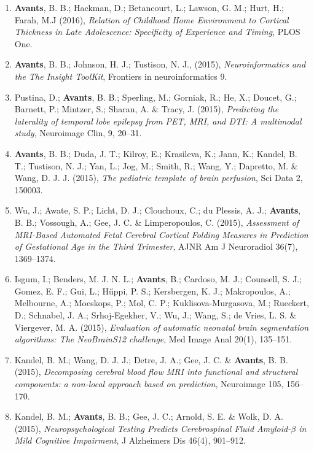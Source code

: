 \documentclass[11pt]{moderncv} %
\begin{document}
\begin{enumerate}
\item \textbf{Avants}, B. B.; Hackman, D.; Betancourt, L.; Lawson, G. M.; Hurt, H.; Farah, M.J (2016), \textit{Relation of Childhood Home Environment to Cortical Thickness in Late Adolescence: Specificity of Experience and Timing}, PLOS One.

\item  \textbf{Avants}, B. B.; Johnson, H. J.; Tustison, N. J., (2015), \textit{Neuroinformatics and the The Insight ToolKit}, Frontiers in neuroinformatics 9.

\item Pustina, D.; \textbf{Avants}, B. B.; Sperling, M.; Gorniak, R.; He, X.; Doucet, G.; Barnett, P.; Mintzer, S.; Sharan, A. \& Tracy, J. (2015), \textit{Predicting the laterality of temporal lobe epilepsy from PET, MRI, and DTI: A multimodal study}, Neuroimage Clin, 9, 20--31.

\item \textbf{Avants}, B. B.; Duda, J. T.; Kilroy, E.; Krasileva, K.; Jann, K.; Kandel, B. T.; Tustison, N. J.; Yan, L.; Jog, M.; Smith, R.; Wang, Y.; Dapretto, M. \& Wang, D. J. J. (2015), \textit{The pediatric template of brain perfusion}, Sci Data 2, 150003.

\item Wu, J.; Awate, S. P.; Licht, D. J.; Clouchoux, C.; du Plessis, A. J.; \textbf{Avants}, B. B.; Vossough, A.; Gee, J. C. \& Limperopoulos, C. (2015), \textit{Assessment of MRI-Based Automated Fetal Cerebral Cortical Folding Measures in Prediction of Gestational Age in the Third Trimester}, AJNR Am J Neuroradiol 36(7), 1369--1374.

\item Isgum, I.; Benders, M. J. N. L.; \textbf{Avants}, B.; Cardoso, M. J.; Counsell, S. J.; Gomez, E. F.; Gui, L.; Hűppi, P. S.; Kersbergen, K. J.; Makropoulos, A.; Melbourne, A.; Moeskops, P.; Mol, C. P.; Kuklisova-Murgasova, M.; Rueckert, D.; Schnabel, J. A.; Srhoj-Egekher, V.; Wu, J.; Wang, S.; de Vries, L. S. \& Viergever, M. A. (2015), \textit{Evaluation of automatic neonatal brain segmentation algorithms: The NeoBrainS12 challenge}, Med Image Anal 20(1), 135--151.

\item Kandel, B. M.; Wang, D. J. J.; Detre, J. A.; Gee, J. C. \& \textbf{Avants}, B. B. (2015), \textit{Decomposing cerebral blood flow MRI into functional and structural components: a non-local approach based on prediction}, Neuroimage 105, 156--170.

\item Kandel, B. M.; \textbf{Avants}, B. B.; Gee, J. C.; Arnold, S. E. \& Wolk, D. A. (2015), \textit{Neuropsychological Testing Predicts Cerebrospinal Fluid Amyloid-$\beta$ in Mild Cognitive Impairment}, J Alzheimers Dis 46(4), 901--912.


\end{enumerate}
\end{document}
